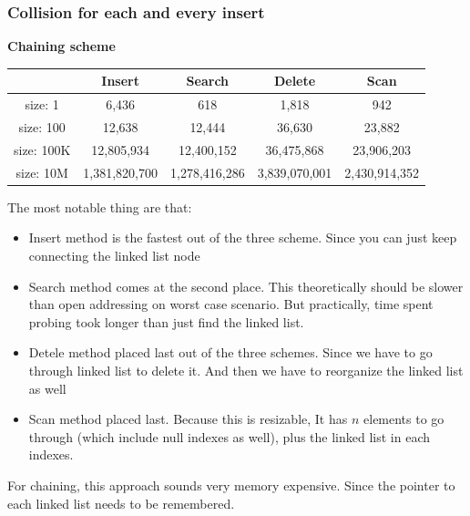 \documentclass{article} %
\begin{document}
    \subsubsection*{Collision for each and every insert}
    \textbf{Chaining scheme}
    \begin{center}
        \begin{tabular}{|c|c|c|c|c|}\hline
        & Insert & Search & Delete & Scan\\\hline
        size: 1 & 6,436 & 618 & 1,818 & 942\\\hline
        size: 100 & 12,638 & 12,444 & 36,630 & 23,882\\\hline
        size: 100K & 12,805,934 & 12,400,152 & 36,475,868 & 23,906,203\\\hline
        size: 10M & 1,381,820,700 & 1,278,416,286 & 3,839,070,001 & 2,430,914,352\\\hline
        \end{tabular}
    \end{center}
    The most notable thing are that:
    \begin{itemize}
        \item Insert method is the fastest out of the three scheme.
        Since you can just keep connecting the linked list node
        \item Search method comes at the second place.
        This theoretically should be slower than open addressing on worst case scenario.
        But practically, time spent probing took longer than just find the linked list.
        \item Detele method placed last out of the three schemes.
        Since we have to go through linked list to delete it.
        And then we have to reorganize the linked list as well
        \item Scan method placed last.
        Because this is resizable, It has $n$ elements to go through (which include null indexes as well), plus the linked list in each indexes.
    \end{itemize}
    For chaining, this approach sounds very memory expensive.
    Since the pointer to each linked list needs to be remembered.
\end{document}
